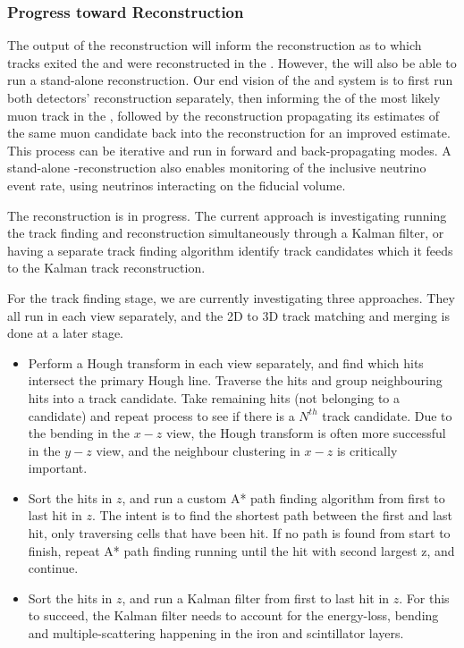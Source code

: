 \subsubsection{Progress toward Reconstruction}

The output of the  reconstruction will inform the  reconstruction as to which tracks exited the  and were reconstructed in the . However, the  will also be able to run a stand-alone reconstruction. Our end vision of the  and  system is to first run both detectors' reconstruction separately, then informing the  of the most likely muon track in the , followed by the  reconstruction propagating its estimates of the same muon candidate back into the  reconstruction for an improved  estimate. This process can be iterative and run in forward and back-propagating modes. A stand-alone -reconstruction also enables monitoring of the inclusive neutrino event rate, using neutrinos interacting on the  fiducial volume.

The  reconstruction is in progress. The current approach is investigating running the track finding and reconstruction simultaneously through a Kalman filter, or having a separate track finding algorithm identify track candidates which it feeds to the Kalman track reconstruction.

For the track finding stage, we are currently investigating three approaches. They all run in each view separately, and the 2D to 3D track matching and merging is done at a later stage.

\begin{itemize}
    \item Perform a Hough transform \cite{hough} in each view separately, and find which hits intersect the primary Hough line. Traverse the hits and group neighbouring hits into a track candidate. Take remaining hits (not belonging to a candidate) and repeat process to see if there is a $N^{th}$ track candidate. Due to the bending in the $x-z$ view, the Hough transform is often more successful in the $y-z$ view, and the neighbour clustering in $x-z$ is critically important.

    \item Sort the hits in $z$, and run a custom A* path finding algorithm from first to last hit in $z$. The intent is to find the shortest path between the first and last hit, only traversing cells that have been hit. If no path is found from start to finish, repeat A* path finding running until the hit with second largest z, and continue.
    
    \item Sort the hits in $z$, and run a Kalman filter from first to last hit in $z$. For this to succeed, the Kalman filter needs to account for the energy-loss, bending and multiple-scattering happening in the iron and scintillator layers. 
\end{itemize}

